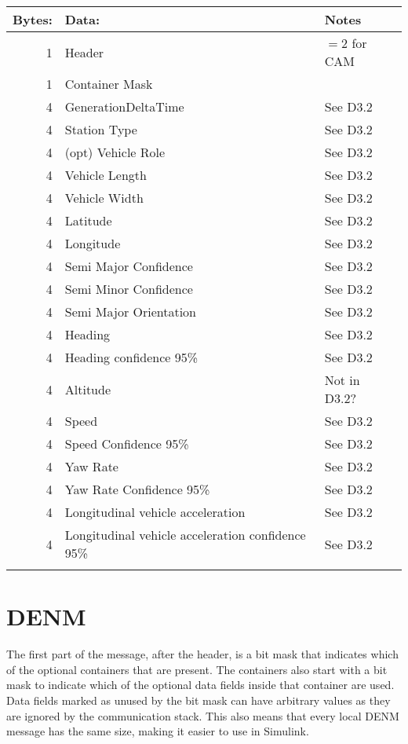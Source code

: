 \documentclass[11pt]{article}
\begin{document}
\begin{center}
\begin{tabular}{rll}
\hline
Bytes: & Data: & Notes\\
\hline
1 & Header & \(=2\) for CAM\\
1 & Container Mask & \\
4 & GenerationDeltaTime & See D3.2\\
4 & Station Type & See D3.2\\
4 & (opt) Vehicle Role & See D3.2\\
4 & Vehicle Length & See D3.2\\
4 & Vehicle Width & See D3.2\\
4 & Latitude & See D3.2\\
4 & Longitude & See D3.2\\
4 & Semi Major Confidence & See D3.2\\
4 & Semi Minor Confidence & See D3.2\\
4 & Semi Major Orientation & See D3.2\\
4 & Heading & See D3.2\\
4 & Heading confidence 95\% & See D3.2\\
4 & Altitude & Not in D3.2?\\
4 & Speed & See D3.2\\
4 & Speed Confidence 95\% & See D3.2\\
4 & Yaw Rate & See D3.2\\
4 & Yaw Rate Confidence 95\% & See D3.2\\
4 & Longitudinal vehicle acceleration & See D3.2\\
4 & Longitudinal vehicle acceleration confidence 95\% & See D3.2\\
 &  & \\
\end{tabular}
\end{center}


\newpage
\section{DENM}
\label{sec:orgheadline3}
The first part of the message, after the header, is a bit mask that
indicates which of the optional containers that are present. The
containers also start with a bit mask to indicate which of the
optional data fields inside that container are used. Data fields
marked as unused by the bit mask can have arbitrary values as they are
ignored by the communication stack. This also means that every local
DENM message has the same size, making it easier to use in Simulink.
\end{document}
